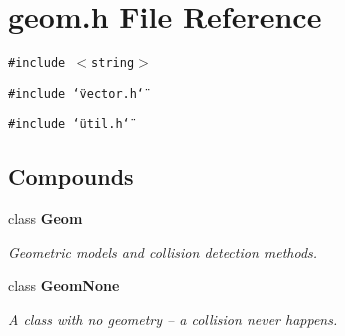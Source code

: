 \section{geom.h File Reference}
\label{geom_8h}
{\tt \#include $<$string$>$}\par
{\tt \#include \char`\"{}vector.h\char`\"{}}\par
{\tt \#include \char`\"{}util.h\char`\"{}}\par
\subsection*{Compounds}
\begin{CompactItemize}
\item 
class {\bf Geom}
\begin{CompactList}\small\item\em Geometric models and collision detection methods.\item\end{CompactList}\item 
class {\bf Geom\-None}
\begin{CompactList}\small\item\em A class with no geometry -- a collision never happens.\item\end{CompactList}\end{CompactItemize}
